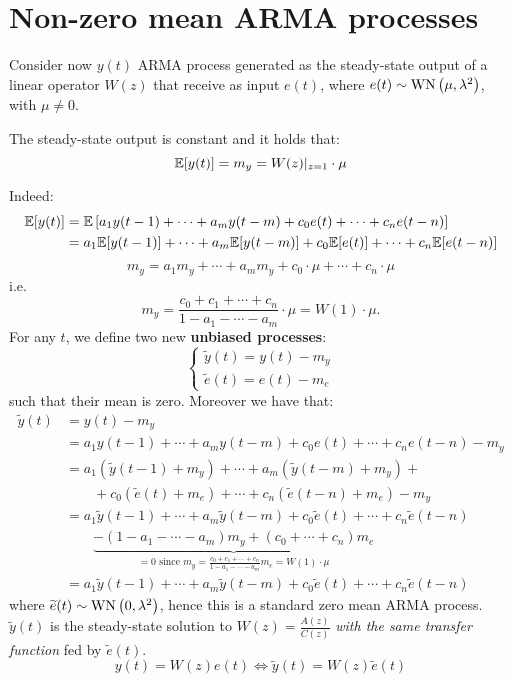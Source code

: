\section{Non-zero mean ARMA processes}\label{sec:non-zero-mean-arma}
Consider now $y(t)$ ARMA process generated as the steady-state output of a linear operator $W(z)$ that receive as input $e(t)$, where $e(t) \sim \operatorname{WN}\left(\mu, \lambda^{2}\right)$, with $\mu\neq0$.

\begin{theorem}\label{thm:gain-theorem}
	The steady-state output is constant and it holds that:
	\[
		\mathbb{E}[y(t)]=m_{y}=W(z)|_{z=1} \cdot \mu
	\]
\end{theorem}

Indeed:
\begin{align*}
		\mathbb{E}[y(t)] &=\mathbb{E}\left[a_{1} y(t-1)+\cdots+a_{m} y(t-m)+c_{0} e(t)+\cdots+c_{n} e(t-n)\right] \\
		&=a_{1} \mathbb{E}[y(t-1)]+\cdots+a_{m} \mathbb{E}[y(t-m)]+c_{0} \mathbb{E}[e(t)]+\cdots+c_{n} \mathbb{E}[e(t-n)]
\end{align*}
$$
m_{y}=a_{1} m_{y}+\cdots+a_{m} m_{y}+c_{0} \cdot \mu+\cdots+c_{n} \cdot \mu
$$
i.e.
\[
	m_{y}=\frac{c_{0}+c_{1}+\cdots+c_{n}}{1-a_{1}-\cdots-a_{m}} \cdot \mu=W(1) \cdot \mu.
\]
For any $t$, we define two new \textbf{unbiased processes}:
$$
\boxed{
	\begin{cases}
		\tilde{y}(t)=y(t)-m_{y}\\
		\tilde{e}(t)=e(t)-m_{e}
	\end{cases}
}
$$
such that their mean is zero. Moreover we have that:
\begin{align*}
	\tilde{y}(t)&= y(t)-m_{y}\\
	&= a_{1} y(t-1)+\cdots+a_{m} y(t-m)+c_{0} e(t)+\cdots+c_{n} e(t-n)-m_{y} \\
	&= a_{1}\left(\tilde{y}(t-1)+m_{y}\right)+\cdots+a_{m }\left(\tilde{y}(t-m)+m_{y}\right)+\\
	&\qquad +c_{0}\left(\tilde{e}(t)+m_{e}\right)+\cdots+c_{n}\left(\tilde{e}(t-n)+m_{e}\right)-m_{y} \\
	&= a_{1} \tilde{y}(t-1)+\cdots+a_{m} \tilde{y}(t-m)+c_{0} \tilde{e}(t)+\cdots+c_{n} \tilde{e}(t-n) \\
	&\qquad \underbrace{-\left(1-a_{1}-\cdots-a_{m}\right) m_{y}+\left(c_{0}+\cdots + c_{n}\right) m_{e}}_{=0\text { since } m_{y}=\frac{c_{0}+c_{1}+\cdots+c_{n}}{1-a_{1}-\cdots-a_{m }} m_{e}=W(1) \cdot \mu} \\
	&=a_{1} \tilde{y}(t-1)+\cdots+a_{m} \tilde{y}(t-m)+c_{0} \tilde{e}(t)+\cdots+c_{n} \tilde{e}(t-n)
\end{align*}
where $\widetilde{e}(t)\sim \operatorname{WN}\left(0, \lambda^{2}\right)$, hence this is a standard zero mean ARMA process. $\tilde{y}(t)$ is the steady-state solution to $W(z)=\frac{A(z)}{C(z)}$ \emph{with the same transfer function} fed by $\tilde{e}(t)$.
\[
	\boxed{y(t)=W(z)e(t) \iff \tilde{y}(t)=W(z)\tilde{e}(t)}
\]

